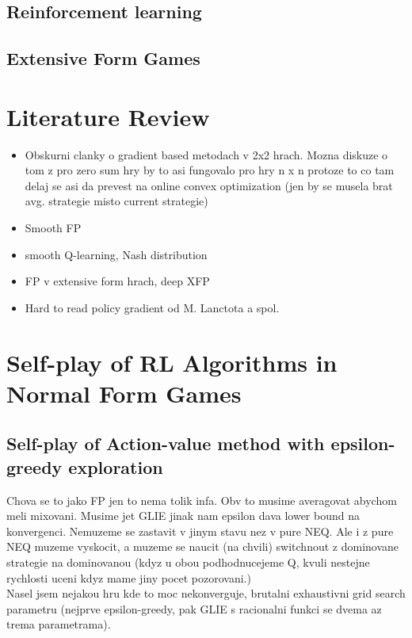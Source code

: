 \documentclass{article}
\theoremstyle{remark}
\theoremstyle{definition}
\newtheorem{definition}{Definition}[section]
\begin{document}
\begin{comment}
Related definitions follow:

\begin{definition}
	The maxmin strategy for player $i$ is defined as 
	$$
	\operatorname*{argmax}_{\sigma_i \in \Sigma_i} \operatorname*{argmin}_{\sigma_{-i} \in \Sigma_{-i}} u(\sigma_i, \sigma_{-i})
	$$
\end{definition}
\begin{definition}
	For a two-players zero-sum game with NEQ $\sigma^*$, a value of the game is defined as $u_1(\sigma^*)$.
\end{definition}
\end{comment}

\subsection{Reinforcement learning}
\subsection{Extensive Form Games}


\newpage
\section{Literature Review}
\begin{itemize}
	\item Obskurni clanky o gradient based metodach v 2x2 hrach. Mozna diskuze o tom z pro zero sum hry by to asi fungovalo pro hry n x n protoze to co tam delaj se asi da prevest na online convex optimization (jen by se musela brat avg. strategie misto current strategie)
	\item  Smooth FP
	\item smooth Q-learning, Nash distribution
	\item FP v extensive form hrach, deep XFP
	\item Hard to read policy gradient od M. Lanctota a spol.
\end{itemize}

\newpage
\section{Self-play of RL Algorithms in Normal Form Games}
\subsection{Self-play of Action-value method with epsilon-greedy exploration}
Chova se to jako FP jen to nema tolik infa. Obv to musime averagovat abychom meli mixovani. Musime jet GLIE jinak nam epsilon dava lower bound na konvergenci. Nemuzeme se zastavit v jinym stavu nez v pure NEQ. Ale i z pure NEQ muzeme vyskocit, a muzeme se naucit (na chvili) switchnout z dominovane strategie na dominovanou (kdyz u obou podhodnucejeme Q, kvuli nestejne rychlosti uceni kdyz mame jiny pocet pozorovani.) \\
Nasel jsem nejakou hru kde to moc nekonverguje, brutalni exhaustivni grid search parametru (nejprve epsilon-greedy, pak GLIE s racionalni funkci se dvema az trema parametrama).
\end{document}
